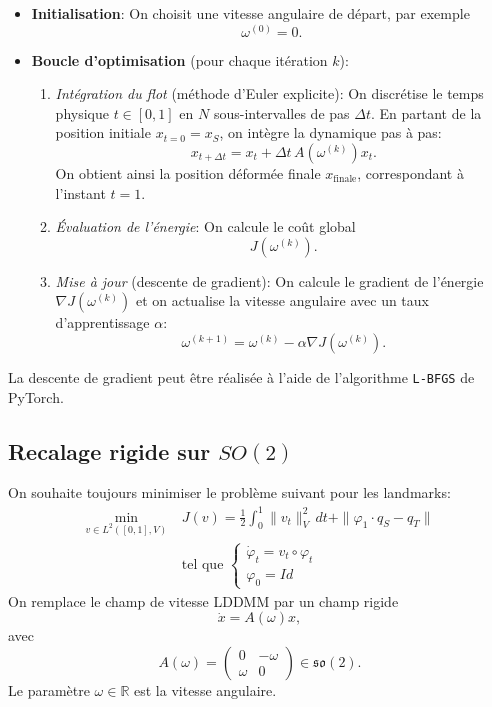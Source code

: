 \documentclass[12pt]{report}
\begin{document}
\begin{itemize}
  \item \textbf{Initialisation}: On choisit une vitesse angulaire de départ, par exemple
  \[
  \omega^{(0)} = 0.
  \]
  \item \textbf{Boucle d'optimisation} (pour chaque itération \(k\)):
  \begin{enumerate}
    \item \textit{Intégration du flot} (méthode d'Euler explicite):
    On discrétise le temps physique \(t \in [0,1]\) en \(N\) sous-intervalles de pas \(\Delta t\). En partant de la position initiale \(x_{t=0}=x_S\), on intègre la dynamique pas à pas:
    \[
    x_{t+\Delta t}=x_t + \Delta t\, A\!\left(\omega^{(k)}\right)x_t.
    \]
    On obtient ainsi la position déformée finale \(x_{\text{finale}}\), correspondant à l'instant \(t=1\).
    \item \textit{Évaluation de l'énergie}:
    On calcule le coût global
    \[
    J\!\left(\omega^{(k)}\right).
    \]
    \item \textit{Mise à jour} (descente de gradient):
    On calcule le gradient de l'énergie
    \(\nabla J(\omega^{(k)})\)
    et on actualise la vitesse angulaire avec un taux d'apprentissage \(\alpha\):
    \[
    \omega^{(k+1)}=\omega^{(k)}-\alpha \nabla J\!\left(\omega^{(k)}\right).
    \]
  \end{enumerate}
\end{itemize}
La descente de gradient peut être réalisée à l'aide de l'algorithme \texttt{L-BFGS} de PyTorch.

\subsection{Recalage rigide sur \texorpdfstring{$SO(2)$}{SO (2)}}

On souhaite toujours minimiser le problème suivant pour les landmarks:
\[
\begin{aligned}
\min_{v\in L^2([0,1],V)}~&J(v)=\frac{1}{2}\int_{0}^{1}\|v_t\|_{V}^2\,dt+\|\varphi_1\cdot q_S-q_T\|\\
&\text{tel que }\left\{\begin{array}{ll}\dot{\varphi}_t=v_t\circ\varphi_t\\\varphi_0=Id\end{array}\right.
\end{aligned}
\]
On remplace le champ de vitesse LDDMM par un champ rigide
\[
\dot{x} = A(\omega)x,
\]
avec
\[
A(\omega)=\begin{pmatrix}0 & -\omega \\\omega & 0\end{pmatrix}\in \mathfrak{so}(2).
\]
Le paramètre \(\omega \in \mathbb{R}\) est la vitesse angulaire.
\end{document}
